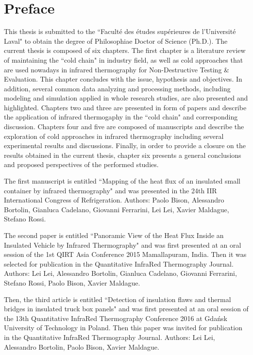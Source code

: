 \chapter*{Preface}         %

This thesis is submitted to the ``Faculté des études supérieures de l'Université Laval" to obtain the degree of Philosophiae Doctor of Science (Ph.D.). The current thesis is composed of six chapters. The first chapter is a literature review of maintaining the ``cold chain" in industry field, as well as cold approaches that are used nowadays in infrared thermography for Non-Destructive Testing \& Evaluation. This chapter concludes with the issue, hypothesis and objectives. In addition, several common data analyzing and processing methods, including modeling and simulation applied in whole research studies, are also presented and highlighted. Chapters two and three are presented in form of papers and describe the application of infrared thermogaphy in the ``cold chain" and corresponding discussion. Chapters four and five are composed of manuscripts and describe the exploration of cold approaches in infrared thermography including several experimental results and discussions. Finally, in order to provide a closure on the results obtained in the current thesis, chapter six presents a general conclusions and proposed perspectives of the performed studies.

The first manuscript is entitled ``Mapping of the heat flux of an insulated small container by infrared thermography" and was presented in the 24th IIR International Congress of Refrigeration. Authors: Paolo Bison, Alessandro Bortolin, Gianluca Cadelano, Giovanni Ferrarini, Lei Lei, Xavier Maldague, Stefano Rossi.

The second paper is entitled ``Panoramic View of the Heat Flux Inside an Insulated Vehicle by Infrared Thermography" and was first presented at an oral session of the 1st QIRT Asia Conference 2015 Mamallapuram, India. Then it was selected for publication in the Quantitative InfraRed Thermography Journal. Authors: Lei Lei, Alessandro Bortolin, Gianluca Cadelano, Giovanni Ferrarini, Stefano Rossi, Paolo Bison, Xavier Maldague. 

Then, the third article is entitled ``Detection of insulation flaws and thermal bridges in insulated truck box panels" and was first presented at an oral session of the 13th Quantitative InfraRed Thermography Conference 2016 at Gdańsk University of Technology in Poland. Then this paper was invited for publication in the Quantitative InfraRed Thermography Journal. Authors: Lei Lei, Alessandro Bortolin, Paolo Bison, Xavier Maldague.

